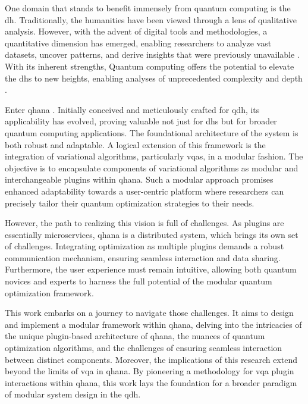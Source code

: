 \documentclass[
  a4paper,  %
  twoside,  %
  bibliography=totoc,
  headsepline,
  cleardoublepage=empty,
  parskip=half,
  draft=false
]{scrbook}
\begin{document}
One domain that stands to benefit immensely from quantum computing is the \gls{dh}.
Traditionally, the humanities have been viewed through a lens of qualitative analysis.
However, with the advent of digital tools and methodologies, a quantitative dimension has emerged, enabling researchers to analyze vast datasets, uncover patterns, and derive insights that were previously unavailable \cite{Barzen2019}.
With its inherent strengths, Quantum computing offers the potential to elevate the \glspl{dh} to new heights, enabling analyses of unprecedented complexity and depth \cite{Barzen2022}.

Enter \gls{qhana} \cite{Buehler2022}.
Initially conceived and meticulously crafted for \gls{qdh}, its applicability has evolved, proving valuable not just for \glspl{dh} but for broader quantum computing applications.
The foundational architecture of the system is both robust and adaptable.
A logical extension of this framework is the integration of variational algorithms, particularly \glspl{vqa}, in a modular fashion.
The objective is to encapsulate components of variational algorithms as modular and interchangeable plugins within \gls{qhana}.
Such a modular approach promises enhanced adaptability towards a user-centric platform where researchers can precisely tailor their quantum optimization strategies to their needs.

However, the path to realizing this vision is full of challenges.
As plugins are essentially microservices, \gls{qhana} is a distributed system, which brings its own set of challenges.
Integrating optimization as multiple plugins demands a robust communication mechanism, ensuring seamless interaction and data sharing.
Furthermore, the user experience must remain intuitive, allowing both quantum novices and experts to harness the full potential of the modular quantum optimization framework.

This work embarks on a journey to navigate those challenges. It aims to design and implement a modular framework within \gls{qhana}, delving into the intricacies of the unique plugin-based architecture of \gls{qhana}, the nuances of quantum optimization algorithms, and the challenges of ensuring seamless interaction between distinct components.
Moreover, the implications of this research extend beyond the limits of \gls{vqa} in \gls{qhana}.
By pioneering a methodology for \gls{vqa} plugin interactions within \gls{qhana}, this work lays the foundation for a broader paradigm of modular system design in the \gls{qdh}.
\end{document}
